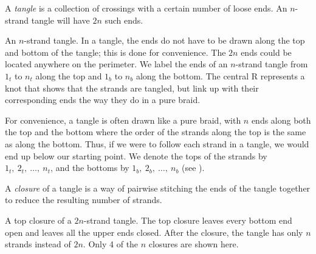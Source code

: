\begin{paper}

A \textit{tangle} is a collection of crossings with a certain number of loose
ends.
An $n$-strand tangle will have $2n$ such ends.

{An $n$-strand tangle.
In a tangle, the ends do not have to be drawn along the top and bottom of the
tangle; this is done for convenience.
The $2n$ ends could be located anywhere on the perimeter.
We label the ends of an $n$-strand tangle from $1_t$ to $n_t$ along the top and
$1_b$ to $n_b$ along the bottom.
The central R represents a knot that shows that the strands are tangled, but
link up with their corresponding ends the way they do in a pure braid.}

For convenience, a tangle is often drawn like a pure braid, with $n$ ends along
both the top and the bottom where the order of the strands along the top is the
same as along the bottom.
Thus, if we were to follow each strand in a tangle, we would end up below our
starting point.
We denote the tops of the strands by $1_t,~2_t,~\dots,~n_t$, and the
bottoms  by $1_b,~2_b,~\dots,~n_b$ (see \figTangle).

A \textit{closure} of a tangle is a way of pairwise stitching the ends of the
tangle together to reduce the resulting number of strands.

{A top closure of a $2n$-strand tangle.
The top closure leaves every bottom end open and leaves all the upper ends
closed.
After the closure, the tangle has only $n$ strands instead of $2n$.
Only 4 of the $n$ closures are shown here.}


\end{paper}
